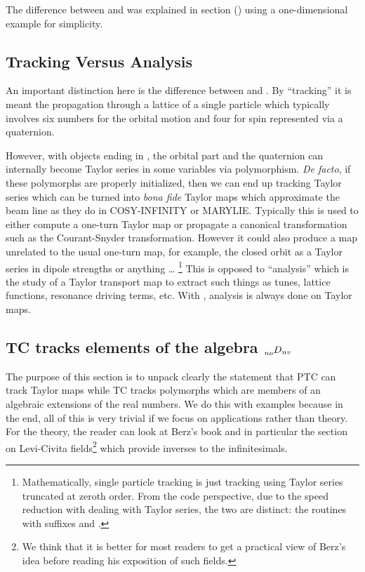 \documentclass{hitec}     %
\begin{document}
The difference between  and \vn{*} was explained in section () using a one-dimensional example for simplicity.  

\subsection{Tracking Versus Analysis}
\label{s:tracking.analysis}

An important distinction here is the difference between  and . By
``tracking'' it is meant  the propagation through a lattice of a single particle {\color{h} which typically 
involves six  numbers for the orbital motion and four   for spin represented via a quaternion.}

{\color{h} However,  with  objects ending in  , the orbital part and the quaternion can   internally become Taylor series in some variables via polymorphism.
{\it De facto}, if these polymorphs are properly initialized, then we can end up tracking Taylor series which can be turned into {\it bona fide} Taylor maps which approximate the beam line as they do in COSY-INFINITY or MARYLIE. Typically this is used to either compute a one-turn Taylor map or propagate a 
canonical transformation such as the Courant-Snyder transformation. However it could also produce a map unrelated to the usual one-turn map, for example, the closed orbit as a Taylor series in  dipole strengths or anything \ldots}
 \footnote
  {
Mathematically, single particle tracking is just tracking  using Taylor series
truncated at zeroth order. From the code perspective, due to the speed reduction with dealing with
Taylor series, the two are distinct: the routines with suffixes  and .
  }
This is opposed to ``analysis'' which is the study of a {\color{h} Taylor} transport map to extract such things as
tunes, lattice functions, resonance driving terms, etc. With , analysis is always done on  {\color{h} Taylor}  maps.

\subsection{TC tracks elements of the algebra $\prescript{}{no}{D}_{nv}$
}
\label{s:tpsadef}

The purpose of this section is to unpack clearly the statement that PTC can track Taylor maps while TC tracks polymorphs which are members of an algebraic extensions of the real numbers. We do this with examples because in the end, all of this is very trivial if we focus on applications rather than theory. For the theory, the reader can look at Berz's book \cite{theberzbook} and in particular  the section on Levi-Civita fields\footnote{We think that it is better for most readers to get a practical view of Berz's idea before reading his exposition of such fields.} which provide inverses to the infinitesimals.
\end{document}
